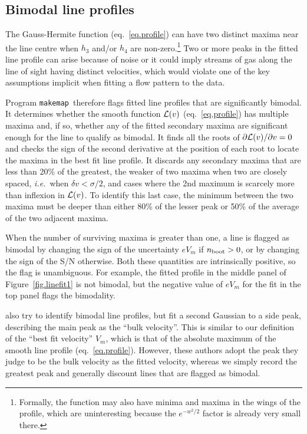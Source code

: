 \documentclass[letterpaper,fleqn,usenatbib]{mnras}
\def\ie{{\it i.e.}}
\def\mkm{{\tt makemap}}
\begin{document}
\subsection{Bimodal line profiles}
\label{sec.bimod}
The Gauss-Hermite function (eq.~\ref{eq.profile}) can have two distinct
maxima near the line centre when $h_3$ and/or $h_4$ are
non-zero.\footnote{Formally, the function may also have minima and
  maxima in the wings of the profile, which are uninteresting because
  the $e^{-w^2/2}$ factor is already very small there.}  Two or more
peaks in the fitted line profile can arise because of noise or it
could imply streams of gas along the line of sight having distinct
velocities, which would violate one of the key assumptions implicit
when fitting a flow pattern to the data.

Program \mkm\ therefore flags fitted line profiles that are
significantly bimodal.  It determines whether the smooth function
${\cal L}(v)$ (eq.~\ref{eq.profile}) has multiple maxima and, if so,
whether any of the fitted secondary maxima are significant enough for
the line to qualify as bimodal.  It finds all the roots of
$\partial{\cal L}(v) / \partial v = 0$ and checks the sign of the
second derivative at the position of each root to locate the maxima in
the best fit line profile.  It discards any secondary maxima that are
less than 20\% of the greatest, the weaker of two maxima when two are
closely spaced, \ie\ when $\delta v < \sigma/2$, and cases where the
2nd maximum is scarcely more than inflexion in ${\cal L}(v)$.  To
identify this last case, the minimum between the two maxima must be
deeper than either 80\% of the lesser peak or 50\% of the average of
the two adjacent maxima.

When the number of surviving maxima is greater than one, a line is
flagged as bimodal by changing the sign of the uncertainty $eV_m$ if
$n_{\rm boot}>0$, or by changing the sign of the S/N otherwise.  Both
these quantities are intrinsically positive, so the flag is
unambiguous.  For example, the fitted profile in the middle panel of
Figure~\ref{fig.linefit1} is not bimodal, but the negative value of
$eV_m$ for the fit in the top panel flags the bimodality.

\citet{Oh08, Oh19} also try to identify bimodal line profiles, but
fit a second Gaussian to a side peak, describing the main peak as the
``bulk velocity''.  This is similar to our definition of the ``best
fit velocity'' $V_m$, which is that of the absolute maximum of the
smooth line profile (eq.~\ref{eq.profile}).  However, these authors
adopt the peak they judge to be the bulk velocity as the fitted
velocity, whereas we simply record the greatest peak and generally
discount lines that are flagged as bimodal.
\end{document}
